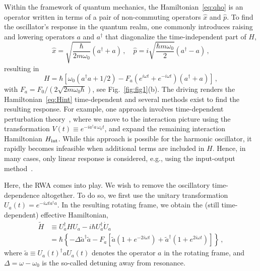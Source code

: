 Within the framework of quantum mechanics, the Hamiltonian~\eqref{eq:qho} is an operator written in terms of a pair of non-commuting operators $\hat{x}$ and $\hat{p}$.
To find the oscillator’s response in the quantum realm, one commonly introduces raising and lowering operators
$a$ and $a^\dagger$ that diagonalize the time-independent
part of $H$,
\begin{equation} \label{eq:as}
\hat{x} =\sqrt{\frac{\hbar}{2m\omega_0}}(a^\dagger+a)\,, \quad \hat{p} = i\sqrt{\frac{\hbar m \omega_0}{2}}(a^\dagger - a)\,, 
\end{equation}
resulting in
\begin{equation} \label{eq:Hint}
H = \hbar \left[ \omega_0(a^\dagger a+1/2)-  F_a(e^{i\omega t} +e^{-i\omega t})(a^\dagger+a) \right]\,,
\end{equation}
with $F_a=F_0/(2\sqrt{2m\omega_0 \hbar})$, see Fig.~\ref{fig:fig1}(b). The driving renders the Hamiltonian~\eqref{eq:Hint} time-dependent and several methods exist to find the resulting response. For example, one approach involves time-dependent perturbation theory~\cite{Sakurai_1995}, where we move to the interaction picture using the transformation $V(t)\equiv e^{-i a^\dagger a \,\omega_0 t}$, and expand the remaining interaction Hamiltonian $H_{\rm int}$. While this approach is possible for the harmonic oscillator, it rapidly becomes infeasible when additional terms are included in $H$. Hence, in many cases, only linear response is considered, e.g., using the input-output method~\cite{Walls_Milburn}.

Here, the RWA comes into play. We wish to remove the oscillatory time-dependence altogether. To do so, we first use the unitary transformation $U_a(t) = e^{-i \omega t a^\dagger a}$. In the resulting rotating frame, we obtain the (still time-dependent) effective Hamiltonian,
\begin{align}\label{eq:rot_H}
\tilde{H} &\equiv U_a^\dagger H U_a - i \hbar U_a^\dagger \dot{U}_a \\
&=\hbar\left\{-\Delta \tilde{a}^\dagger \tilde{a} - F_a\left[ \tilde{a} \left (1+e^{-2i\omega t} \right) + \tilde{a}^\dagger \left(1 + e^{2i\omega t}\right) \right] \right\} \,,\nonumber
\end{align}
where $\tilde{a} \equiv U_a(t)^\dagger a U_a(t)$ denotes the operator $a$ in the rotating frame, and $\Delta=\omega - \omega_0$ is the so-called detuning away from resonance.

